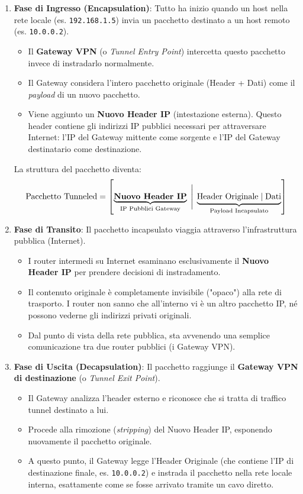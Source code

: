 \documentclass[a4paper, 11pt]{article}
\begin{document}
\begin{enumerate}
    \item \textbf{Fase di Ingresso (Encapsulation)}:
    Tutto ha inizio quando un host nella rete locale (es. \texttt{192.168.1.5}) invia un pacchetto destinato a un host remoto (es. \texttt{10.0.0.2}).
    \begin{itemize}
        \item Il \textbf{Gateway VPN} (o \textit{Tunnel Entry Point}) intercetta questo pacchetto invece di instradarlo normalmente.
        \item Il Gateway considera l'intero pacchetto originale (Header + Dati) come il \textit{payload} di un nuovo pacchetto.
        \item Viene aggiunto un \textbf{Nuovo Header IP} (intestazione esterna). Questo header contiene gli indirizzi IP pubblici necessari per attraversare Internet: l'IP del Gateway mittente come sorgente e l'IP del Gateway destinatario come destinazione.
    \end{itemize}
    \vspace{0.2cm}
    La struttura del pacchetto diventa:
    \[
    \text{Pacchetto Tunneled} = \left[ \underbrace{\text{\textbf{Nuovo Header IP}}}_{\text{IP Pubblici Gateway}} \; \Bigg| \; \underbrace{\text{Header Originale} \; | \; \text{Dati}}_{\text{Payload Incapsulato}} \right]
    \]

    \item \textbf{Fase di Transito}:
    Il pacchetto incapsulato viaggia attraverso l'infrastruttura pubblica (Internet).
    \begin{itemize}
        \item I router intermedi su Internet esaminano esclusivamente il \textbf{Nuovo Header IP} per prendere decisioni di instradamento.
        \item Il contenuto originale è completamente invisibile ("opaco") alla rete di trasporto. I router non sanno che all'interno vi è un altro pacchetto IP, né possono vederne gli indirizzi privati originali.
        \item Dal punto di vista della rete pubblica, sta avvenendo una semplice comunicazione tra due router pubblici (i Gateway VPN).
    \end{itemize}

    \item \textbf{Fase di Uscita (Decapsulation)}:
    Il pacchetto raggiunge il \textbf{Gateway VPN di destinazione} (o \textit{Tunnel Exit Point}).
    \begin{itemize}
        \item Il Gateway analizza l'header esterno e riconosce che si tratta di traffico tunnel destinato a lui.
        \item Procede alla rimozione (\textit{stripping}) del Nuovo Header IP, esponendo nuovamente il pacchetto originale.
        \item A questo punto, il Gateway legge l'Header Originale (che contiene l'IP di destinazione finale, es. \texttt{10.0.0.2}) e instrada il pacchetto nella rete locale interna, esattamente come se fosse arrivato tramite un cavo diretto.
    \end{itemize}
\end{enumerate}
\end{document}
